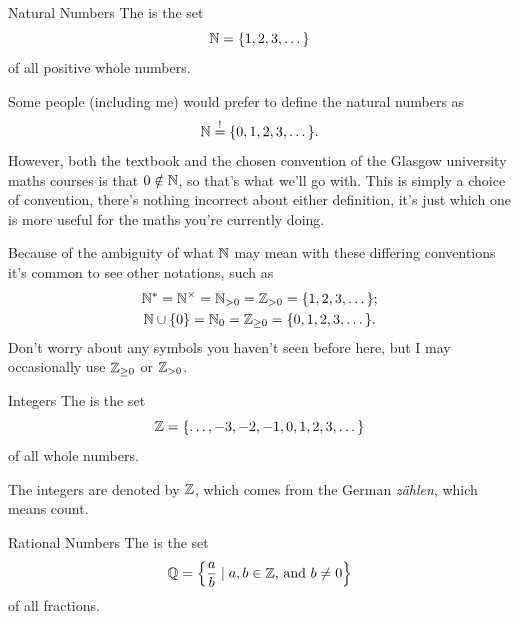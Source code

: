 \documentclass[fleqn]{LectureClass/LectureClass}
\begin{document}
    \begin{dfn}{Natural Numbers}{}
        The  is the set
        \begin{equation}
            \mathbb{N} = \{1, 2, 3, \dotsc\}
        \end{equation}
        of all positive whole numbers.
    \end{dfn}
    \begin{remark}{}{}
        Some people (including me) would prefer to define the natural numbers as
        \begin{equation}
            \mathbb{N} \stackrel{!}{=} \{0, 1, 2, 3, \dotsc\}.
        \end{equation}
        However, both the textbook and the chosen convention of the Glasgow university maths courses is that \(0 \notin \mathbb{N}\), so that's what we'll go with.
        This is simply a choice of convention, there's nothing incorrect about either definition, it's just which one is more useful for the maths you're currently doing.
        
        Because of the ambiguity of what \(\mathbb{N}\) may mean with these differing conventions it's common to see other notations, such as
        \begin{gather}
            \mathbb{N}^{*} = \mathbb{N}^{\times} = \mathbb{N}_{>0} = \mathbb{Z}_{>0} = \{1, 2, 3, \dotsc\};\\
            \mathbb{N} \cup \{0\} = \mathbb{N}_0 = \mathbb{Z}_{\ge 0} = \{0, 1, 2, 3, \dotsc\}.
        \end{gather}
        Don't worry about any symbols you haven't seen before here, but I may occasionally use \(\mathbb{Z}_{\ge 0}\) or \(\mathbb{Z}_{>0}\).
    \end{remark}
    
    \begin{dfn}{Integers}{}
        The  is the set
        \begin{equation}
            \mathbb{Z} = \{\dotsc, -3, -2, -1, 0, 1, 2, 3, \dotsc\}
        \end{equation}
        of all whole numbers.
    \end{dfn}
    
    \begin{remark}{}{}
        The integers are denoted by \(\mathbb{Z}\), which comes from the German \textit{z\"ahlen}, which means count.
    \end{remark}
    
    \begin{dfn}{Rational Numbers}{}
        The  is the set
        \begin{equation}
            \mathbb{Q} = \left\{ \frac{a}{b} \mid a, b \in \mathbb{Z} \text{, and } b \ne 0 \right\}
        \end{equation}
        of all fractions.
    \end{dfn}
    
\end{document}
